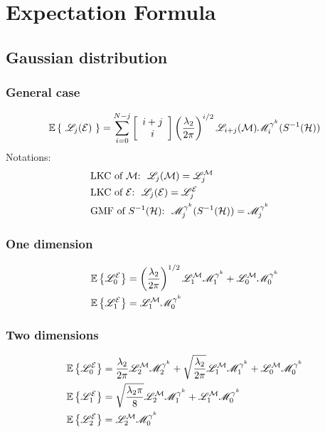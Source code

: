 \documentclass[a4paper,12pt]{article}
\begin{document}
\section{Expectation Formula}
\subsection{Gaussian distribution}
\subsubsection{General case}
\begin{equation}
  \mathbb{E}\left\{\ \mathscr{L}_j(\mathcal{E}) \ \right\} = \sum_{i=0}^{N-j} \left[ \begin{array}{c}i+j\\i\end{array}\right]\left(\frac{\lambda_2}{2\pi}\right)^{i/2}\mathscr{L}_{i+j}(\mathcal{M})\mathscr{M}^{\gamma^k}_i(S^{-1}(\mathcal{H}))
\end{equation}
Notations:
  \begin{subequations}
    \begin{flalign}
      & \text{LKC of $\mathcal{M}$:} \ \ \mathscr{L}_j(\mathcal{M}) = \mathscr{L}_j^{\mathcal{M}} & \\
      & \text{LKC of $\mathcal{E}$:} \ \ \mathscr{L}_j(\mathcal{E}) = \mathscr{L}_j^{\mathcal{E}} & \\
      & \text{GMF of $S^{-1}(\mathcal{H})$:} \ \  \mathscr{M}^{\gamma^k}_j(S^{-1}(\mathcal{H})) = \mathscr{M}^{\gamma^k}_j
    \end{flalign}
  \end{subequations}
\subsubsection{One dimension}
\begin{subequations}
\begin{align}
  &\mathbb{E}\left\{\mathscr{L}_0^{\mathcal{E}}\right\} = \left(\frac{\lambda_2}{2\pi}\right)^{1/2}\mathscr{L}_1^{\mathcal{M}}\mathscr{M}^{\gamma^k}_1 + \mathscr{L}_0^{\mathcal{M}}\mathscr{M}^{\gamma^k}_0\\
  &\mathbb{E}\left\{\mathscr{L}_1^{\mathcal{E}}\right\} = \mathscr{L}_1^{\mathcal{M}}\mathscr{M}^{\gamma^k}_0
\end{align}
\end{subequations}

\subsubsection{Two dimensions}
\begin{subequations}
\begin{align}
  &\mathbb{E}\left\{\mathscr{L}_0^{\mathcal{E}}\right\} = \frac{\lambda_2}{2\pi}\mathscr{L}_2^{\mathcal{M}}\mathscr{M}^{\gamma^k}_2 + \sqrt{\frac{\lambda_2}{2\pi}}\mathscr{L}_1^{\mathcal{M}}\mathscr{M}^{\gamma^k}_1 + \mathscr{L}_0^{\mathcal{M}}\mathscr{M}^{\gamma^k}_0\\
  &\mathbb{E}\left\{\mathscr{L}_1^{\mathcal{E}}\right\} = \sqrt{\frac{\lambda_2\pi}{8}}\mathscr{L}_2^{\mathcal{M}}\mathscr{M}^{\gamma^k}_1 + \mathscr{L}_1^{\mathcal{M}}\mathscr{M}^{\gamma^k}_0\\
  &\mathbb{E}\left\{\mathscr{L}_2^{\mathcal{E}}\right\} = \mathscr{L}_2^{\mathcal{M}}\mathscr{M}^{\gamma^k}_0
\end{align}
\end{subequations}
\end{document}
